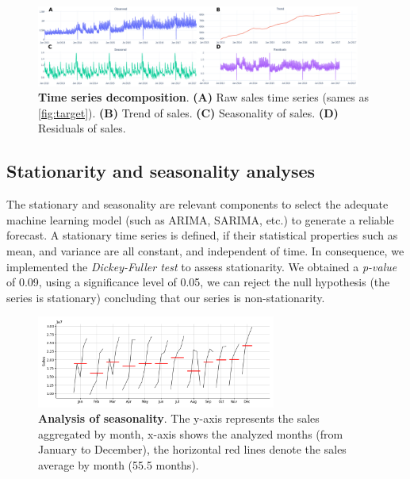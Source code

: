 \begin{figure}[!htb]
  \centering
  \includegraphics[width=0.95\textwidth]{plots/eda/timseries_decomposition.png}
  \caption[Time series decomposition]{\textbf{Time series decomposition}. \textbf{(A)} Raw sales time series (sames as \autoref{fig:target}). \textbf{(B)} Trend of sales. \textbf{(C)} Seasonality of sales. \textbf{(D)} Residuals of sales. }
  \label{fig:ts-decomposition}
\end{figure}

\subsection[Stationarity and seasonality analyses]{Stationarity and seasonality analyses}
\label{sec:st_s_analysis}

The stationary and seasonality are relevant components to select the adequate machine learning model (such as ARIMA, SARIMA, etc.) to generate a reliable forecast. A stationary time series is defined, if their statistical properties such as mean, and variance are all constant, and independent of time. In consequence, we implemented the \textit{Dickey-Fuller test} to assess stationarity. We obtained a \textit{p-value} of 0.09, using a significance level of 0.05, we can reject the null hypothesis (the series is stationary) concluding that our series is non-stationarity.


\begin{figure}[!htb]
  \centering
  \includegraphics[width=0.7\textwidth]{plots/eda/seasonal_analysis.png}
  \caption[Analysis of seasonality]{\textbf{Analysis of seasonality}. The y-axis represents the sales aggregated by month, x-axis shows the analyzed months (from January to December), the horizontal red lines denote the sales average by month (55.5 months).}
  \label{fig:seasonal_plot}
\end{figure}

